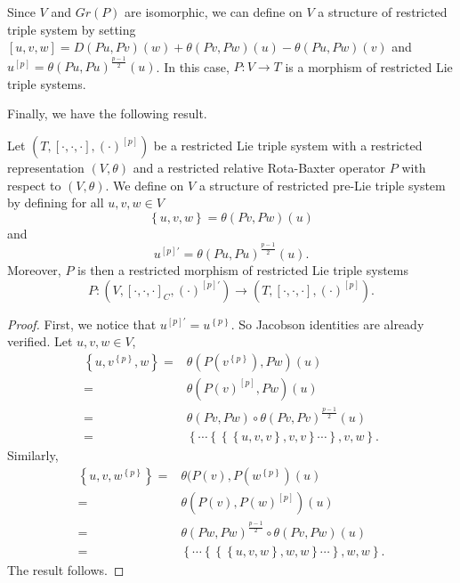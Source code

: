 \documentclass[11pt, twoside]{article}
\begin{document}
Since $V$ and $Gr(P)$ are isomorphic, we can define on $V$ a structure of restricted triple system by setting $[u,v,w]=D(P u,P v)(w)+\theta(P v,P w)(u)- \theta(P u,P w)(v) $ and $u^{[p]}= \theta(P u,P u)^{\frac{p-1}{2}}(u) $. In this case, $P:V\to T $ is a morphism of restricted Lie triple systems.

Finally, we have the following result.
\begin{prop}
    Let $(T,[\cdot,\cdot,\cdot], (\cdot)^{[p]})$ be a restricted Lie triple system with a restricted representation $(V,\theta) $ and a restricted relative Rota-Baxter operator $P$ with respect to $(V,\theta)$. We  define on $V$ a structure of restricted pre-Lie triple system by defining for all $u,v,w\in V$ $$\left\{ u,v,w\right\}= \theta(Pv,Pw)(u) $$ and $$u^{[p]'}= \theta(Pu,Pu)^{\frac{p-1}{2}}(u) . $$ Moreover, $P$ is then a restricted morphism of restricted Lie triple systems $$P: (V,[\cdot,\cdot,\cdot]_C,(\cdot)^{[p]'})\to (T,[\cdot,\cdot,\cdot],(\cdot)^{[p]}). $$
\end{prop}

\begin{proof}
    First, we notice that $u^{[p]'}=u^{\left\{p\right\}} $. So  Jacobson identities are already verified. Let $u,v,w\in V$, \begin{align*}
        \left\{ u,v^{\left\{p\right\}},w\right\}=& \theta(P(v^{\left\{p \right\}}),Pw)(u) \\ =&\theta(P(v)^{[p]},Pw)(u)\\ =& \theta(Pv,Pw)\circ \theta(Pv,Pv)^{\frac{p-1}{2}}(u) \\ = &\left\{\cdots \left\{\left\{\left\{ u,v,v\right\},v,v \right\}\cdots\right\},v,w\right\}. \end{align*} Similarly, \begin{align*}
            \left\{ u,v,w^{\left\{p\right\}}\right\}=& \theta(P(v),P(w^{\left\{p\right\}})(u) \\ =&\theta(P(v),P(w)^{[p]})(u)\\ =& \theta(Pw,Pw)^{\frac{p-1}{2}}\circ\theta(Pv,Pw)(u) \\ = &\left\{\cdots \left\{\left\{\left\{ u,v,w\right\},w,w \right\}\cdots\right\},w,w\right\}. \end{align*}
        The result follows.
\end{proof}

\end{document}
